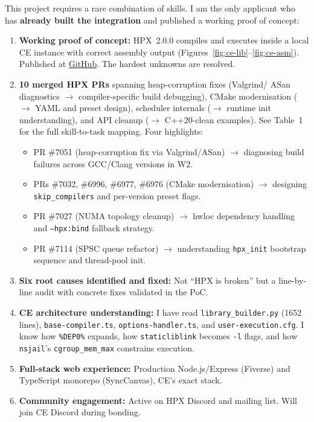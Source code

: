 \documentclass[11pt, a4paper]{article}
\newcommand{\code}[1]{\texttt{#1}}
\newcommand{\cefile}[1]{\texttt{#1}}
\begin{document}
This project requires a rare combination of skills.  I am the only applicant
who has \textbf{already built the integration} and published a working
proof of concept:

\begin{enumerate}[leftmargin=2em, itemsep=3pt]
  \item \textbf{Working proof of concept:} HPX~2.0.0 compiles and executes
        inside a local CE instance with correct assembly output
        (Figures~\ref{fig:ce-lib}--\ref{fig:ce-asm}).  Published at
        \href{https://github.com/GitMasterJatin/Integrating-HPX-with-Compiler-Explorer-}%
        {GitHub}.  The hardest unknowns are resolved.

  \item \textbf{10 merged HPX PRs} spanning heap-corruption fixes (Valgrind/
        ASan diagnostics $\to$ compiler-specific build debugging), CMake
        modernisation ($\to$ YAML and preset design), scheduler internals
        ($\to$ runtime init understanding), and API cleanup ($\to$ C++20-clean
        examples).  See Table~1 for the full skill-to-task mapping.
        Four highlights:
        \begin{itemize}[leftmargin=1.5em, itemsep=1pt, topsep=2pt]
          \item PR \#7051 (heap-corruption fix via Valgrind/ASan) $\to$
                diagnosing build failures across GCC/Clang versions in W2.
          \item PRs \#7032, \#6996, \#6977, \#6976 (CMake modernisation) $\to$
                designing \code{skip\_compilers} and per-version preset flags.
          \item PR \#7027 (NUMA topology cleanup) $\to$ hwloc dependency
                handling and \code{--hpx:bind} fallback strategy.
          \item PR \#7114 (SPSC queue refactor) $\to$ understanding
                \code{hpx\_init} bootstrap sequence and thread-pool init.
        \end{itemize}

  \item \textbf{Six root causes identified and fixed:} Not ``HPX is broken''
        but a line-by-line audit with concrete fixes validated in the PoC.

  \item \textbf{CE architecture understanding:} I have read
        \cefile{library\_builder.py} (1652 lines),
        \cefile{base-compiler.ts}, \cefile{options-handler.ts}, and
        \cefile{user-execution.cfg}.  I know how \code{\%DEP0\%} expands,
        how \code{staticliblink} becomes \code{-l} flags, and how
        \code{nsjail}'s \code{cgroup\_mem\_max} constrains execution.

  \item \textbf{Full-stack web experience:} Production Node.js/Express
        (Fiverse) and TypeScript monorepo (SyncCanvas), CE's exact stack.

  \item \textbf{Community engagement:} Active on HPX Discord and mailing list.
        Will join CE Discord during bonding.
\end{enumerate}
\end{document}
